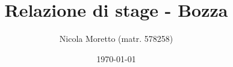 \documentclass[11pt,a4paper,headsepline,hidelinks]{scrreprt} %
\begin{document}
  \title{Relazione di stage - Bozza}
	\subject{Analisi e progettazione di un'interfaccia grafica per la consultazione dei contenuti informativi in una piattaforma web tematica}
  \author{Nicola Moretto (matr. 578258)}
  \date{\today}

  \maketitle

	\tableofcontents

	\listoffigures
	\begingroup
	\let\clearpage\relax
	\listoftables
	\endgroup

	
	
	
	
	

	\appendix
	
	
	
\end{document}
